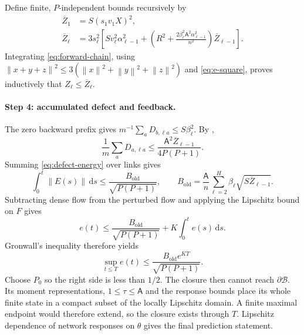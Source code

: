 \documentclass[11pt]{article}
\theoremstyle{definition}
\theoremstyle{remark}
\newcommand{\norm}[1]{\left\lVert #1\right\rVert}
\newcommand{\dd}{\,\mathrm{d}}
\begin{document}
Define finite, $P$-independent bounds recursively by
\begin{align}
 \overline Z_1&=S(s_1v_1X)^2,\nonumber\\
 \overline Z_\ell&=3s_\ell^2\left[
 S v_\ell^2\alpha_{\ell-1}^2+
 \left(R^2+\frac{2\beta_\ell^2\mathsf A^2\alpha_{\ell-1}^2}{n^2}\right)
 \overline Z_{\ell-1}\right].                       \label{eq:z-recursion}
\end{align}
Integrating \eqref{eq:forward-chain}, using
$\norm{x+y+z}^2\le3(\norm{x}^2+\norm{y}^2+\norm{z}^2)$ and
\eqref{eq:e-square}, proves inductively that $Z_\ell\le\overline Z_\ell$.

\paragraph{Step 4: accumulated defect and feedback.}
The zero backward prefix gives
$m^{-1}\sum_aD_{b,\ell a}\le S\beta_\ell^2$.  By
,
\[
 \frac1m\sum_aD_{a,\ell a}
 \le\frac{\mathsf A^2\overline Z_{\ell-1}}{4P(P+1)}.
\]
Summing \eqref{eq:defect-energy} over links gives
\begin{equation}
 \int_0^t\norm{E(s)}\dd s
 \le\frac{B_{\mathrm{old}}}{\sqrt{P(P+1)}},\qquad
 B_{\mathrm{old}}=\frac{\mathsf A}{n}
 \sum_{\ell=2}^H\beta_\ell\sqrt{S\overline Z_{\ell-1}}. \label{eq:old-defect-bound}
\end{equation}
Subtracting dense flow from the perturbed flow and applying the Lipschitz
bound on $F$ gives
\[
 e(t)\le\frac{B_{\mathrm{old}}}{\sqrt{P(P+1)}}
 +K\int_0^te(s)\dd s.
\]
Gronwall's inequality therefore yields
\begin{equation}
 \sup_{t\le T}e(t)\le
 \frac{B_{\mathrm{old}}e^{KT}}{\sqrt{P(P+1)}}.       \label{eq:old-explicit}
\end{equation}
Choose $P_0$ so the right side is less than $1/2$.  The closure then cannot
reach $\partial\mathcal B$.  Its moment representations, $1\le\tau\le\mathsf A$
and the response bounds place its whole finite state in a compact subset of the
locally Lipschitz domain.  A finite maximal endpoint would therefore extend,
so the closure exists through $T$.  Lipschitz dependence of network responses
on $\theta$ gives the final prediction statement.
\end{document}
